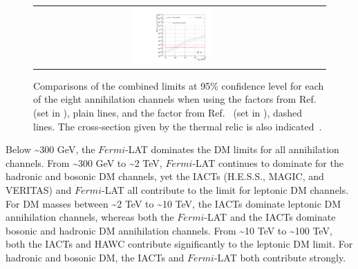 \begin{figure}[h]
{\begin{tabular}{ccc}
    \includegraphics[width=0.3\textwidth]{figures/glory_duck/comparison/GD_limits_tautau.pdf} &
    \end{tabular}
    }
    \caption{Comparisons of the combined limits at 95\% confidence level for each of the eight annihilation channels when using the \J factors from Ref.~\cite{Geringer-Sameth:2014yza} (\GS set in ), plain lines, and the \J factor from Ref.~\cite{Bonnivard:2014kza, Bonnivard:2015xpq} (\B set in ), dashed lines. The cross-section given by the thermal relic is also indicated~\cite{Bertone_2005}.}
\label{fig:limits-comparison}
\end{figure}

Below \textasciitilde300 GeV, the $Fermi$-LAT dominates the DM limits for all annihilation channels.
From \textasciitilde300 GeV to \textasciitilde2 TeV, $Fermi$-LAT continues to dominate for the hadronic and bosonic DM channels, yet the IACTs (H.E.S.S., MAGIC, and VERITAS) and $Fermi$-LAT all contribute to the limit for leptonic DM channels.
For DM masses between \textasciitilde2 TeV to \textasciitilde10 TeV, the IACTs dominate leptonic DM annihilation channels, whereas both the $Fermi$-LAT and the IACTs dominate bosonic and hadronic DM annihilation channels.
From \textasciitilde10 TeV to \textasciitilde100 TeV, both the IACTs and HAWC contribute significantly to the leptonic DM limit.
For hadronic and bosonic DM, the IACTs and $Fermi$-LAT both contribute strongly.

\clearpage

